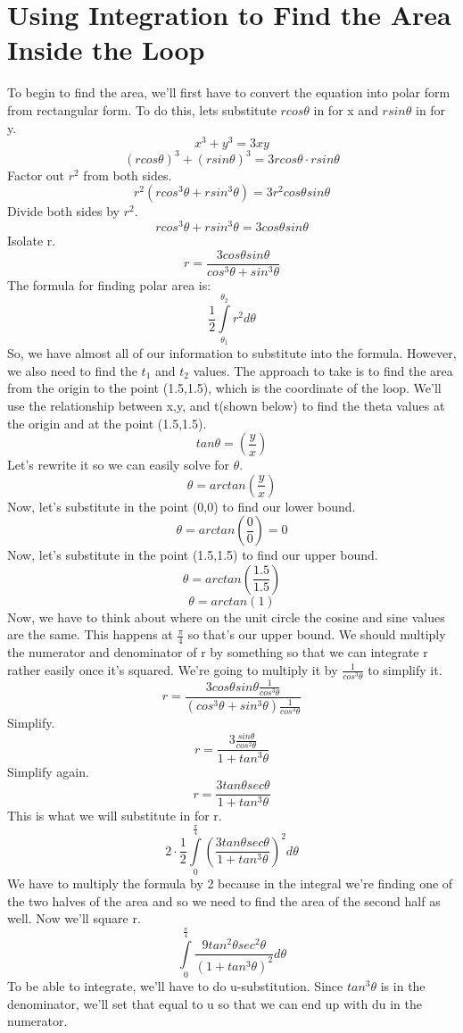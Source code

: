 \documentclass[a4paper,openright, 10pt]{article}
\begin{document}
\section*{Using Integration to Find the Area Inside the Loop}
To begin to find the area, we'll first have to convert the equation into polar form from rectangular form. To do this, lets substitute $rcos\theta$ in for x and $rsin\theta$ in for y.
$$x^3+y^3=3xy$$
$$(rcos\theta)^3+(rsin\theta)^3=3rcos\theta \cdot rsin\theta$$
Factor out $r^2$ from both sides.
$$r^2(rcos^3\theta +rsin^3\theta)=3r^2cos\theta sin\theta$$
Divide both sides by $r^2$.
$$rcos^3\theta +rsin^3\theta=3cos\theta sin\theta$$
Isolate r.
$$r=\frac{3cos\theta sin\theta}{cos^3\theta +sin^3\theta}$$
The formula for finding polar area is:
$$\frac{1}{2}\int\limits_{\theta_1}^{\theta_2} r^2d\theta$$
So, we have almost all of our information to substitute into the formula. However, we also need to find the $t_1$ and $t_2$ values. The approach to take is to find the area from the origin to the point (1.5,1.5), which is the coordinate of the loop. We'll use the relationship between x,y, and t(shown below) to find the theta values at the origin and at the point (1.5,1.5).
$$tan\theta=(\frac{y}{x})$$
Let's rewrite it so we can easily solve for $\theta$.
$$\theta=arctan(\frac{y}{x})$$
Now, let's substitute in the point (0,0) to find our lower bound.
$$\theta=arctan(\frac{0}{0})=0$$
Now, let's substitute in the point (1.5,1.5) to find our upper bound.
$$\theta=arctan(\frac{1.5}{1.5})$$
$$\theta=arctan(1)$$
Now, we have to think about where on the unit circle the cosine and sine values are the same. This happens at $\frac{\pi}{4}$ so that's our upper bound. We should multiply the numerator and denominator of r by something so that we can integrate r rather easily once it's squared. We're going to multiply it by $\frac{1}{cos^3\theta}$ to simplify it.
$$r=\frac{3cos\theta sin\theta \frac{1}{cos^3\theta}}{(cos^3\theta +sin^3\theta)\frac{1}{cos^3\theta}}$$
Simplify.
$$r=\frac{3\frac{sin\theta}{cos^2\theta}}{1+tan^3\theta}$$
Simplify again.
$$r=\frac{3tan\theta sec\theta}{1+tan^3\theta}$$
This is what we will substitute in for r.
$$2\cdot \frac{1}{2}\int\limits_{0}^{\frac{\pi}{4}}(\frac{3tan\theta sec\theta}{1+tan^3\theta})^2d\theta$$
We have to multiply the formula by 2 because in the integral we're finding one of the two halves of the area and so we need to find the area of the second half as well. Now we'll square r.
$$\int\limits_{0}^{\frac{\pi}{4}}\frac{9tan^2\theta sec^2\theta}{(1+tan^3\theta)^2}d\theta$$
To be able to integrate, we'll have to do u-substitution. Since $tan^3\theta$ is in the denominator, we'll set that equal to u so that we can end up with du in the numerator.
\end{document}
